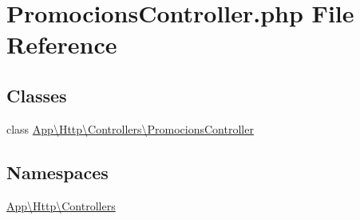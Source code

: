 \hypertarget{_promocions_controller_8php}{}\section{Promocions\+Controller.\+php File Reference}
\label{_promocions_controller_8php}
\subsection*{Classes}
\begin{DoxyCompactItemize}
\item 
class \mbox{\hyperlink{class_app_1_1_http_1_1_controllers_1_1_promocions_controller}{App\textbackslash{}\+Http\textbackslash{}\+Controllers\textbackslash{}\+Promocions\+Controller}}
\end{DoxyCompactItemize}
\subsection*{Namespaces}
\begin{DoxyCompactItemize}
\item 
 \mbox{\hyperlink{namespace_app_1_1_http_1_1_controllers}{App\textbackslash{}\+Http\textbackslash{}\+Controllers}}
\end{DoxyCompactItemize}

